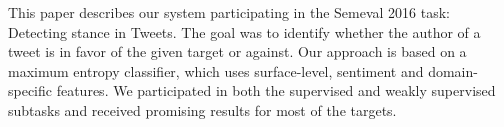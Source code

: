 This paper describes our system participating in the Semeval 2016 task: Detecting stance in Tweets. The goal was to identify whether the author of a tweet is in favor of the given target or against. Our approach is based on a maximum entropy classifier, which uses surface-level, sentiment and domain-specific features. We participated in both the supervised and weakly supervised subtasks and received promising results for most of the targets.
